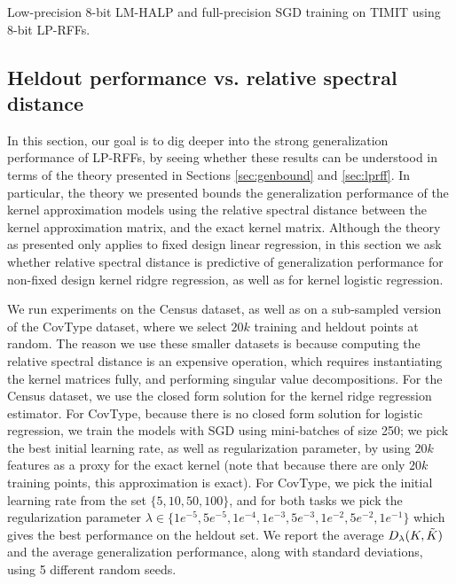 \begin{table}[ht]
\begin{minipage}{0.375\linewidth}
	\caption{Low-precision 8-bit LM-HALP and full-precision SGD training on TIMIT using 8-bit LP-RFFs.}	
	\label{fig:halp}
\end{minipage}
\end{table}


\subsection{Heldout performance vs. relative spectral distance}
\label{subsec:perf_vs_rel_spec_dist}
In this section, our goal is to dig deeper into the strong generalization performance of LP-RFFs, by seeing whether these results can be understood in terms of the theory presented in Sections \ref{sec:genbound} and \ref{sec:lprff}.  In particular, the theory we presented bounds the generalization performance of the kernel approximation models using the relative spectral distance between the kernel approximation matrix, and the exact kernel matrix.  Although the theory as presented only applies to fixed design linear regression, in this section we ask whether relative spectral distance is predictive of generalization performance for non-fixed design kernel ridgre regression, as well as for kernel logistic regression.

We run experiments on the Census dataset, as well as on a sub-sampled version of the CovType dataset, where we select $20k$ training and heldout points at random.  The reason we use these smaller datasets is because computing the relative spectral distance is an expensive operation, which requires instantiating the kernel matrices fully, and performing singular value decompositions. For the Census dataset, we use the closed form solution for the kernel ridge regression estimator.  For CovType, because there is no closed form solution for logistic regression, we train the models with SGD using mini-batches of size 250; we pick the best initial learning rate, as well as regularization parameter, by using $20k$ \Nystrom features as a proxy for the exact kernel (note that because there are only $20k$ training points, this \Nystrom approximation is exact). For CovType, we pick the initial learning rate from the set $\{5, 10, 50, 100\}$, and for both tasks we pick the regularization parameter $\lambda \in \{1e^{-5}, 5e^{-5}, 1e^{-4}, 1e^{-3}, 5e^{-3}, 1e^{-2}, 5e^{-2}, 1e^{-1}\}$ which gives the best performance on the heldout set. We report the average $D_{\lambda}(K,\tilde{K})$ and the average generalization performance, along with standard deviations, using 5 different random seeds.


